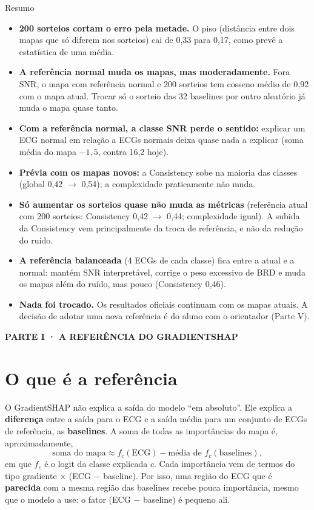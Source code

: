 \documentclass[11pt,a4paper]{article}
\newcommand{\partbar}[1]{\par\vspace{1.2em}\noindent\colorbox{black!80}{\parbox{\dimexpr\linewidth-2\fboxsep}{\color{white}\bfseries\sffamily\MakeUppercase{#1}}}\par\vspace{0.4em}}
\begin{document}
\begin{infobox}[note]{Resumo}
\begin{itemize}
\item \textbf{200 sorteios cortam o erro pela metade.} O piso (distância entre dois mapas que só diferem nos sorteios) cai de 0,33 para 0,17, como prevê a estatística de uma média.
\item \textbf{A referência normal muda os mapas, mas moderadamente.} Fora SNR, o mapa com referência normal e 200 sorteios tem cosseno médio de 0,92 com o mapa atual. Trocar só o sorteio das 32 baselines por outro aleatório já muda o mapa quase tanto.
\item \textbf{Com a referência normal, a classe SNR perde o sentido:} explicar um ECG normal em relação a ECGs normais deixa quase nada a explicar (soma média do mapa $-1{,}5$, contra 16,2 hoje).
\item \textbf{Prévia com os mapas novos:} a Consistency sobe na maioria das classes (global 0,42 $\to$ 0,54); a complexidade praticamente não muda.
\item \textbf{Só aumentar os sorteios quase não muda as métricas} (referência atual com 200 sorteios: Consistency 0,42 $\to$ 0,44; complexidade igual). A subida da Consistency vem principalmente da troca de referência, e não da redução do ruído.
\item \textbf{A referência balanceada} (4 ECGs de cada classe) fica entre a atual e a normal: mantém SNR interpretável, corrige o peso excessivo de BRD e muda os mapas além do ruído, mas pouco (Consistency 0,46).
\item \textbf{Nada foi trocado.} Os resultados oficiais continuam com os mapas atuais. A decisão de adotar uma nova referência é do aluno com o orientador (Parte V).
\end{itemize}
\end{infobox}

\partbar{Parte I · A referência do GradientSHAP}

\section{O que é a referência}
O GradientSHAP não explica a saída do modelo “em absoluto”. Ele explica a \textbf{diferença} entre a saída para o ECG e a saída média para um conjunto de ECGs de referência, as \textbf{baselines}. A soma de todas as importâncias do mapa é, aproximadamente,
\[
\text{soma do mapa} \approx f_c(\text{ECG}) - \text{média de } f_c(\text{baselines}),
\]
em que $f_c$ é o logit da classe explicada $c$. Cada importância vem de termos do tipo gradiente × (ECG $-$ baseline). Por isso, uma região do ECG que é \textbf{parecida} com a mesma região das baselines recebe pouca importância, mesmo que o modelo a use: o fator (ECG $-$ baseline) é pequeno ali.
\end{document}
